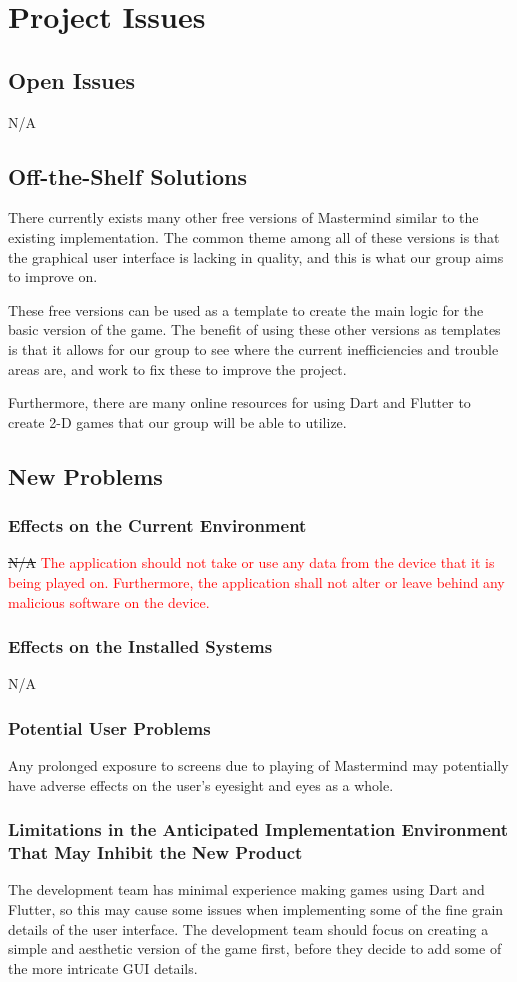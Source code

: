 \documentclass[12pt, titlepage]{article}
\begin{document}
\section{Project Issues}

\subsection{Open Issues}
N/A
\subsection{Off-the-Shelf Solutions}
There currently exists many other free versions of Mastermind similar to the existing implementation. The common theme among all of these versions is that the graphical user interface is lacking in quality, and this is what our group aims to improve on.

These free versions can be used as a template to create the main logic for the basic version of the game. The benefit of using these other versions as templates is that it allows for our group to see where the current inefficiencies and trouble areas are, and work to fix these to improve the project.

Furthermore, there are many online resources for using Dart and Flutter to create 2-D games that our group will be able to utilize.
\subsection{New Problems}
\subsubsection{Effects on the Current Environment}
\sout{N/A} \textcolor{red}{The application should not take or use any data from the device that it is being played on. Furthermore, the application shall not alter or leave behind any malicious software on the device.}
\subsubsection{Effects on the Installed Systems}
N/A
\subsubsection{Potential User Problems}
Any prolonged exposure to screens due to playing of Mastermind may potentially have adverse effects on the user's eyesight and eyes as a whole.
\subsubsection{Limitations in the Anticipated Implementation Environment That May Inhibit the New Product}
The development team has minimal experience making games using Dart and Flutter, so this may cause some issues when implementing some of the fine grain details of the user interface. The development team should focus on creating a simple and aesthetic version of the game first, before they decide to add some of the more intricate GUI details.
\end{document}
